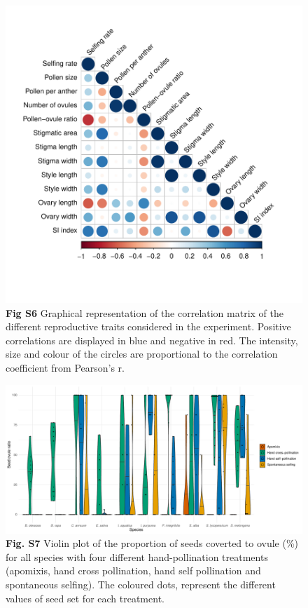 \documentclass[
  12pt,
]{article}
\begin{document}
\begin{figure}
\centering
\includegraphics{Supp_Material_files/figure-latex/unnamed-chunk-9-1.pdf}
\caption{\textbf{Fig S6} Graphical representation of the correlation
matrix of the different reproductive traits considered in the
experiment. Positive correlations are displayed in blue and negative in
red. The intensity, size and colour of the circles are proportional to
the correlation coefficient from Pearson's r.}
\end{figure}

\clearpage

\begin{figure}
\centering
\includegraphics{Supp_Material_files/figure-latex/unnamed-chunk-10-1.pdf}
\caption{\textbf{Fig. S7} Violin plot of the proportion of seeds
coverted to ovule (\%) for all species with four different
hand-pollination treatments (apomixis, hand cross pollination, hand self
pollination and spontaneous selfing). The coloured dots, represent the
different values of seed set for each treatment.}
\end{figure}
\end{document}
